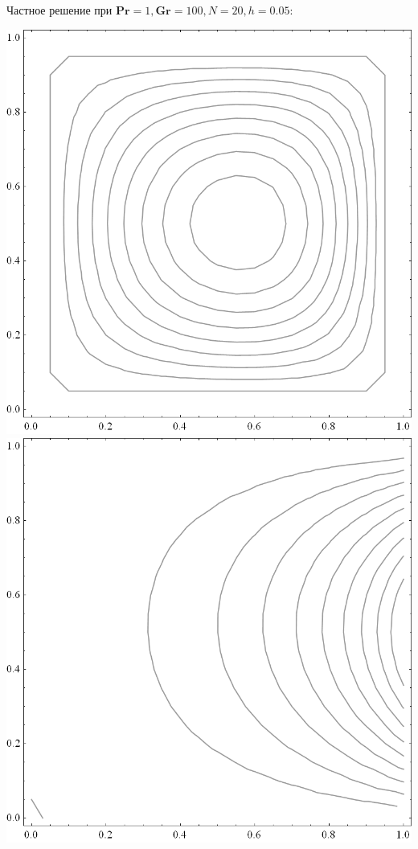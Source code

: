 \documentclass[a4paper, 12pt]{article}
\newcommand{\Pra}{\mathbf{Pr}}
\newcommand{\Gra}{\mathbf{Gr}}
\begin{document}
    \bigskip
    Частное решение при $\Pra = 1, \Gra = 100, N = 20, h = 0.05$:
    \bigskip

    \includegraphics[scale=0.25]{images/psi_100.png}
    \qquad
    \includegraphics[scale=0.25]{images/t_100.png}
\end{document}
